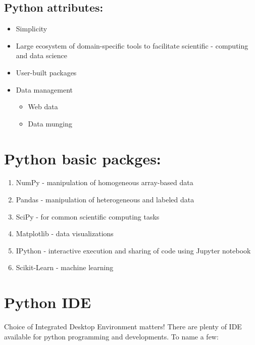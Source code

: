 \documentclass[]{book}
\providecommand{\tightlist}{%
  \setlength{\itemsep}{0pt}\setlength{\parskip}{0pt}}
\begin{document}
\hypertarget{python-attributes}{%
\subsection{Python attributes:}\label{python-attributes}}

\begin{itemize}
\tightlist
\item
  Simplicity
\item
  Large ecosystem of domain-specific tools to facilitate scientific - computing and data science
\item
  User-built packages
\item
  Data management

  \begin{itemize}
  \tightlist
  \item
    Web data
  \item
    Data munging
  \end{itemize}
\end{itemize}

\hypertarget{python-basic-packges}{%
\section{Python basic packges:}\label{python-basic-packges}}

\begin{enumerate}
\def\labelenumi{\arabic{enumi}.}
\tightlist
\item
  NumPy - manipulation of homogeneous array-based data
\item
  Pandas - manipulation of heterogeneous and labeled data
\item
  SciPy - for common scientific computing tasks
\item
  Matplotlib - data visualizations
\item
  IPython - interactive execution and sharing of code using Jupyter notebook
\item
  Scikit-Learn - machine learning
\end{enumerate}

\hypertarget{python-ide}{%
\section{Python IDE}\label{python-ide}}

Choice of Integrated Desktop Environment matters! There are plenty of IDE available for python programming and developments. To name a few:
\end{document}
